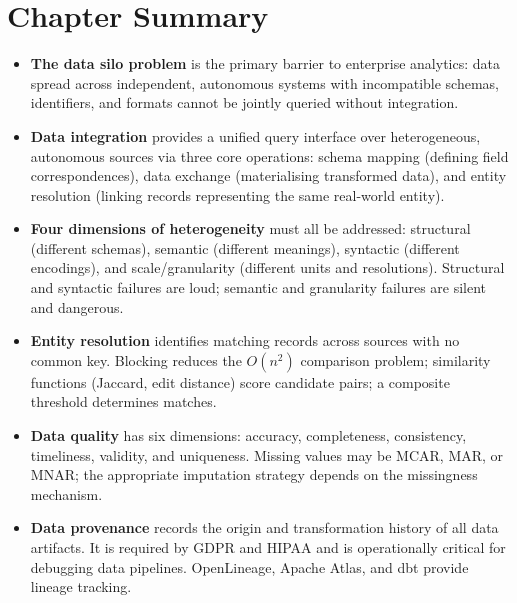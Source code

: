 \section*{Chapter Summary}
\label{sec:ch2-summary}

\begin{itemize}
  \item \textbf{The data silo problem} is the primary barrier to
        enterprise analytics: data spread across independent, autonomous
        systems with incompatible schemas, identifiers, and formats
        cannot be jointly queried without integration.

  \item \textbf{Data integration} provides a unified query interface
        over heterogeneous, autonomous sources via three core operations:
        schema mapping (defining field correspondences), data exchange
        (materialising transformed data), and entity resolution
        (linking records representing the same real-world entity).

  \item \textbf{Four dimensions of heterogeneity} must all be addressed:
        structural (different schemas), semantic (different meanings),
        syntactic (different encodings), and scale/granularity (different
        units and resolutions). Structural and syntactic failures are
        loud; semantic and granularity failures are silent and
        dangerous.

  \item \textbf{Entity resolution} identifies matching records across
        sources with no common key. Blocking reduces the $O(n^2)$
        comparison problem; similarity functions (Jaccard, edit distance)
        score candidate pairs; a composite threshold determines matches.

  \item \textbf{Data quality} has six dimensions: accuracy, completeness,
        consistency, timeliness, validity, and uniqueness. Missing values
        may be MCAR, MAR, or MNAR; the appropriate imputation strategy
        depends on the missingness mechanism.

  \item \textbf{Data provenance} records the origin and transformation
        history of all data artifacts. It is required by GDPR and HIPAA
        and is operationally critical for debugging data pipelines.
        OpenLineage, Apache Atlas, and dbt provide lineage tracking.


\end{itemize}
